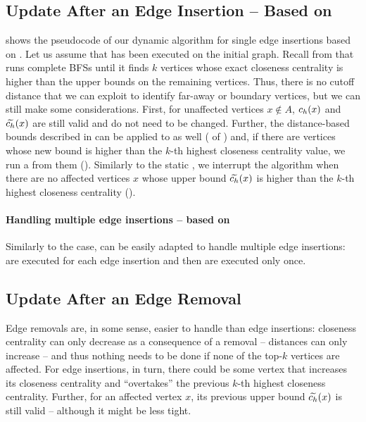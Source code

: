 \subsection{Update After an Edge Insertion -- Based on \nbbound}
\label{sec:topk-clos-single-ins-nbbound}
%
 shows the pseudocode of our dynamic algorithm
for single edge insertions based on \nbbound.
Let us assume that \nbbound has been executed on the initial graph. Recall
from  that \nbbound runs complete BFSs until
it finds $k$ vertices whose exact closeness centrality is higher than the upper
bounds on the remaining vertices.
Thus, there is no cutoff distance that we can exploit to identify far-away or
boundary vertices, but we can still make some considerations. First, for
unaffected vertices $x\notin A$, $c_h(x)$ and $\widetilde{c_h}(x)$ are still valid
and do not need to be changed. Further, the distance-based bounds described
in  can be applied to \nbbound as well
( of ) and,
if there are vertices whose new bound is higher than the $k$-th highest
closeness centrality value, we run a \bfsbound from them
().
Similarly to the static \nbbound, we interrupt the algorithm when there are
no affected vertices $x$ whose upper bound $\widetilde{c_h}(x)$ is higher than
the $k$-th highest closeness centrality ().

\paragraph{Handling multiple edge insertions -- based on \nbbound}
%
Similarly to the \nbcut case,  can be easily
adapted to handle multiple edge insertions:
 are executed
for each edge insertion and then
 are executed
only once.



\subsection{Update After an Edge Removal}
\label{sec:topk-clos-single-rem}
%
Edge removals are, in some sense, easier to handle than edge insertions:
closeness centrality can only decrease as a consequence of a removal --
distances can only increase -- and thus nothing needs to be done if none of the
top-$k$ vertices are affected. For edge insertions, in turn, there could be
some vertex that increases its closeness centrality and \enquote{overtakes} the
previous $k$-th highest closeness centrality. Further, for an affected vertex
$x$, its previous upper bound $\widetilde{c_h}(x)$ is still valid -- although it might
be less tight.

